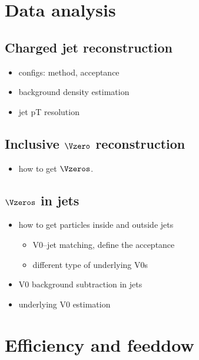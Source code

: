 
\section{Data analysis}

\subsection{Charged jet reconstruction}

\begin{itemize}
\item configs: method, acceptance
\item background density estimation
\item jet pT resolution
\end{itemize}

\subsection{Inclusive $\Vzero$ reconstruction}

\begin{itemize}
\item how to get $\Vzeros$.
\end{itemize}

\subsection{$\Vzeros$ in jets}

\begin{itemize}
\item how to get particles inside and outside jets
  \begin{itemize}
  \item V0--jet matching, define the acceptance
  \item different type of underlying V0s
  \end{itemize}
\item V0 background subtraction in jets
\item underlying V0 estimation
\end{itemize}

\section{Efficiency and feeddow}

